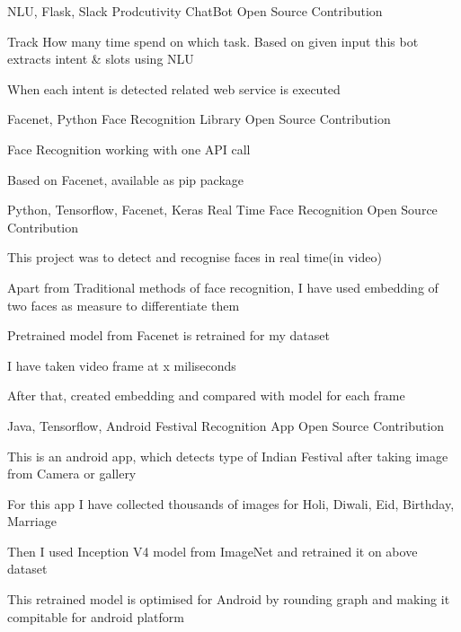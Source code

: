 \begin{cventries}
  \cventry
    {NLU, Flask, Slack} %
    {Prodcutivity ChatBot} %
    {Open Source Contribution} %
    {} %
    {
      \begin{cvitems} %
        \item {Track How many time spend on which task. Based on given input this bot extracts intent \& slots using NLU}
        \item {When each intent is detected related web service is executed}
      \end{cvitems}
    }

  \cventry
    {Facenet, Python} %
    {Face Recognition Library} %
    {Open Source Contribution} %
    {} %
    {
      \begin{cvitems} %
        \item {Face Recognition working with one API call}
        \item {Based on Facenet, available as pip package}
      \end{cvitems}
    }

  \cventry
    {Python, Tensorflow, Facenet, Keras} %
    {Real Time Face Recognition} %
    {Open Source Contribution} %
    {} %
    {
      \begin{cvitems} %
        \item {This project was to detect and recognise faces in real time(in video)}
        \item {Apart from Traditional methods of face recognition, I have used embedding of two faces as measure to differentiate them}
        \item {Pretrained model from Facenet is retrained for my dataset}
        \item {I have taken video frame at x miliseconds}
        \item {After that, created embedding and compared with model for each frame}
      \end{cvitems}
    }

  \cventry
    {Java, Tensorflow, Android} %
    {Festival Recognition App} %
    {Open Source Contribution} %
    {} %
    {
      \begin{cvitems} %
        \item {This is an android app, which detects type of Indian Festival after taking image from Camera or gallery}
        \item {For this app I have collected thousands of images for Holi, Diwali, Eid, Birthday, Marriage}
        \item {Then I used Inception V4 model from ImageNet and retrained it on above dataset}
        \item {This retrained model is optimised for Android by rounding graph and making it compitable for android platform}
      \end{cvitems}
    }


\end{cventries}
